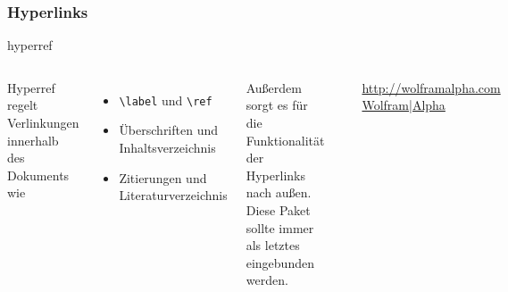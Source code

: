 \subsubsection{Hyperlinks}
\begin{frame}[fragile]{hyperref}

\begin{columns}[c]

    Hyperref regelt Verlinkungen innerhalb des Dokuments wie
    \begin{itemize}
      \item  \texttt{\textbackslash label} und \texttt{\textbackslash ref}
      \item Überschriften und Inhaltsverzeichnis
      \item Zitierungen und Literaturverzeichnis
    \end{itemize}
     Außerdem sorgt es für die Funktionalität der Hyperlinks nach außen.
     \vspace{\baselineskip}\linebreak  
     Diese Paket sollte immer als letztes eingebunden werden.





\begin{lstlisting}[]
...
\usepackage[urlcolor=black]{hyperref}
\hypersetup{backref, pdfpagemode=FullScreen, colorlinks=true}


...
\url{http://wolframalpha.com}
...
\href{http://wolframalpha.com}{WolframAlpha} 
...


\end{lstlisting}

    \begin{outputbox}
\url{http://wolframalpha.com} 
\vspace{\baselineskip}\linebreak 
\href{http://wolframalpha.com}{Wolfram|Alpha}  
\end{outputbox}
    
  \end{columns}


\end{frame}






